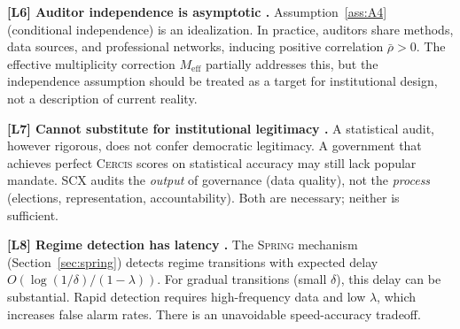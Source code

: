 \documentclass[11pt,a4paper]{article}
\theoremstyle{definition}
\newcommand{\Spring}{\textsc{Spring}}
\newcommand{\Cercis}{\textsc{Cercis}}
\newcommand{\SCX}{\textsc{SCX}}
\newcommand{\limitationTag}[1]{\textsf{\textbf{[L#1]}}}
\begin{document}
\begin{enumerate}[label=\limitationTag{\arabic*},leftmargin=*]
    \item \textbf{\limitationTag{6} Auditor independence is asymptotic .} Assumption~\ref{ass:A4} (conditional independence) is an idealization. In practice, auditors share methods, data sources, and professional networks, inducing positive correlation $\bar{\rho} > 0$. The effective multiplicity correction $M_{\mathrm{eff}}$ partially addresses this, but the independence assumption should be treated as a target for institutional design, not a description of current reality.
    \item \textbf{\limitationTag{7} Cannot substitute for institutional legitimacy .} A statistical audit, however rigorous, does not confer democratic legitimacy. A government that achieves perfect \Cercis{} scores on statistical accuracy may still lack popular mandate. \SCX{} audits the \textit{output} of governance (data quality), not the \textit{process} (elections, representation, accountability). Both are necessary; neither is sufficient.
    \item \textbf{\limitationTag{8} Regime detection has latency .} The \Spring{} mechanism (Section~\ref{sec:spring}) detects regime transitions with expected delay $O(\log(1/\delta) / (1-\lambda))$. For gradual transitions (small $\delta$), this delay can be substantial. Rapid detection requires high-frequency data and low $\lambda$, which increases false alarm rates. There is an unavoidable speed-accuracy tradeoff.
\end{enumerate}
\end{document}
